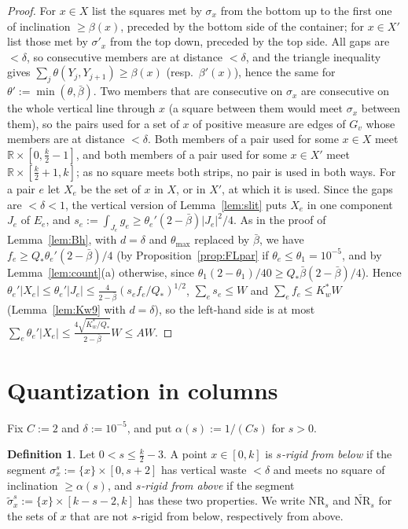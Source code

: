 \documentclass[11pt]{amsart}
\theoremstyle{definition}
\newtheorem{definition}[theorem]{Definition}
\theoremstyle{remark}
\newcommand{\R}{\mathbb{R}}
\begin{document}
\begin{proof}
For $x\in X$ list the squares met by $\sigma_x$ from the bottom up to the first one of inclination $\ge\beta(x)$, preceded by the
bottom side of the container; for $x\in X'$ list those met by $\sigma'_x$ from the top down, preceded by the top side. All gaps
are $<\delta$, so consecutive members are at distance $<\delta$, and the triangle inequality gives
$\sum_j\theta(Y_j,Y_{j+1})\ge\beta(x)$ (resp.\ $\beta'(x)$), hence the same for $\theta':=\min(\theta,\bar\beta)$. Two members that are
consecutive on $\sigma_x$ are consecutive on the whole vertical line through $x$ (a square between them would meet $\sigma_x$
between them), so the pairs used for a set of $x$ of positive measure are edges of $G_v$ whose members are at distance $<\delta$.
Both members of a pair used for some $x\in X$ meet $\R\times[0,\frac k2-1]$, and both members of a pair used for some $x\in X'$ meet
$\R\times[\frac k2+1,k]$; as no square meets both strips, no pair is used in both ways. For a pair $e$ let $X_e$ be the set of
$x$ in $X$, or in $X'$, at which it is used. Since the gaps are $<\delta<1$, the vertical version of Lemma~\ref{lem:slit} puts $X_e$
in one component $J_e$ of $E_e$, and $s_e:=\int_{J_e}g_e\ge\theta_e'(2-\bar\beta)|J_e|^2/4$. As in the proof of Lemma~\ref{lem:Bh}, with
$d=\delta$ and $\theta_{\max}$ replaced by $\bar\beta$, we have $f_e\ge Q_*\theta_e'(2-\bar\beta)/4$ (by Proposition~\ref{prop:FLpar} if
$\theta_e\le\theta_1=10^{-5}$, and by Lemma~\ref{lem:count}(a) otherwise, since $\theta_1(2-\theta_1)/40\ge Q_*\bar\beta(2-\bar\beta)/4$). Hence
$\theta_e'|X_e|\le\theta_e'|J_e|\le\frac4{2-\bar\beta}(s_ef_e/Q_*)^{1/2}$, $\sum_es_e\le W$ and $\sum_ef_e\le K_w^*W$ (Lemma~\ref{lem:Kw9} with $d=\delta$), so the
left-hand side is at most $\sum_e\theta_e'|X_e|\le\frac{4\sqrt{K_w^*/Q_*}}{2-\bar\beta}W\le AW$.
\end{proof}

\section{Quantization in columns}

Fix $C:=2$ and $\delta:=10^{-5}$, and put $\alpha(s):=1/(Cs)$ for $s>0$.

\begin{definition}
Let $0<s\le\frac k2-3$. A point $x\in[0,k]$ is \emph{$s$-rigid from below} if the segment
$\sigma^s_x:=\{x\}\times[0,s+2]$ has vertical waste $<\delta$ and meets no square of inclination $\ge\alpha(s)$, and
\emph{$s$-rigid from above} if the segment $\tilde\sigma^s_x:=\{x\}\times[k-s-2,k]$ has these two properties.
We write $\mathrm{NR}_s$ and $\widetilde{\mathrm{NR}}_s$ for the sets of $x$ that are not $s$-rigid from below, respectively
from above.
\end{definition}
\end{document}
